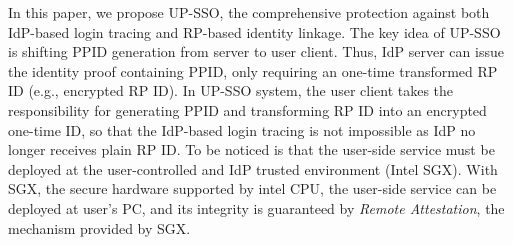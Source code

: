 In this paper, we propose UP-SSO, 
the comprehensive protection against both IdP-based login tracing and RP-based identity linkage.
The key idea of UP-SSO is shifting PPID generation from server to user client. 
Thus, IdP server can issue the identity proof containing PPID, only requiring an one-time transformed RP ID (e.g., encrypted RP ID). 
In UP-SSO system, the user client takes the responsibility for generating PPID and transforming RP ID into an encrypted one-time ID,
so that the IdP-based login tracing is not impossible as IdP no longer receives plain RP ID.
To be noticed is that the user-side service must be deployed at the user-controlled and IdP trusted environment (Intel SGX). 
With SGX, the secure hardware supported by intel CPU, the user-side service can be deployed at user's PC, and its integrity is guaranteed by \emph{Remote Attestation}, the mechanism provided by SGX.



